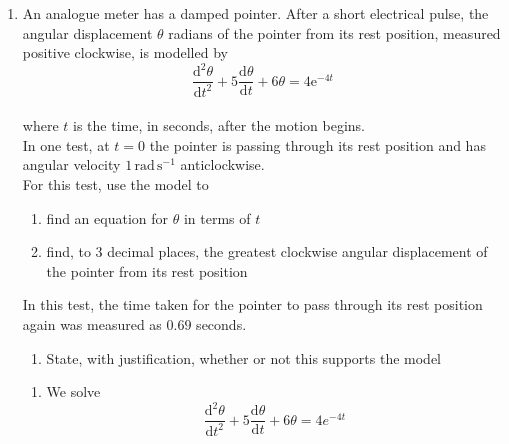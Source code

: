\documentclass[leqno]{article}
\newcommand{\questionitem}{%
  \item\phantomsection
  \addcontentsline{toc}{section}{Question \number\value{enumi}}%
}
\begin{document}
\begin{enumerate}[
  label=\textbf{\arabic*.},
  leftmargin=*,
  topsep=0pt,
  partopsep=0pt,
  parsep=0pt
]
\begin{tcolorbox}[colback=white, colframe=scarlet, title={\textbf{Solution}}, breakable, grow to left by=6mm, grow to right by=10mm]
\begin{enumerate}[label=\textbf{(\alph*)}]
  Evaluating this,
  \[
  m(8)\approx 4.065
  \]

  The machine prints a label only when the displayed mass is less than \(4.05\) kg. Since
  \[
  4.065>4.05
  \]
  the machine will not print a label exactly \(8\) seconds after the box is placed on the platform.
\end{enumerate}
\end{tcolorbox}


\newpage

\questionitem

An analogue meter has a damped pointer. After a short electrical pulse, the angular displacement $\theta$ radians of the pointer from its rest position, measured positive clockwise, is modelled by \\
\[\frac{\mathrm{d}^2 \theta}{\mathrm{d} t^2}+5\frac{\mathrm{d} \theta}{\mathrm{d} t}+6\theta=4\mathrm{e}^{-4t}\] \\
where $t$ is the time, in seconds, after the motion begins. \\

In one test, at $t=0$ the pointer is passing through its rest position and has angular velocity $1\,\mathrm{rad\,s^{-1}}$ anticlockwise. \\

For this test, use the model to
\begin{enumerate}[label=\textbf{(\alph*)}]
  \item find an equation for $\theta$ in terms of $t$  \\
  \item find, to $3$ decimal places, the greatest clockwise angular displacement of the pointer from its rest position  \\
\end{enumerate}
In this test, the time taken for the pointer to pass through its rest position again was measured as $0.69$ seconds. \\
\begin{enumerate}[label=\textbf{(\alph*)}, resume]
  \item State, with justification, whether or not this supports the model  \\
\end{enumerate}

\vspace*{30pt}

\begin{tcolorbox}[colback=white, colframe=scarlet, title={\textbf{Solution}}, breakable, grow to left by=6mm, grow to right by=10mm]
\begin{enumerate}[label=\textbf{(\alph*)}]
\item We solve
\[
\frac{\mathrm{d}^2\theta}{\mathrm{d}t^2}+5\frac{\mathrm{d}\theta}{\mathrm{d}t}+6\theta=4e^{-4t}
\]


\end{enumerate}
\end{tcolorbox}
\end{enumerate}
\end{document}
